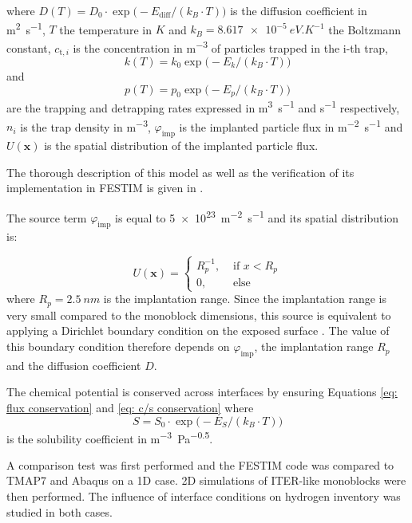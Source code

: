 where ${D(T)=D_0 \cdot \exp\big(-E_\mathrm{diff}/ (k_B \cdot T )\big)}$ is the diffusion coefficient in \si{m^2.s^{-1}}, $T$ the temperature in $\si{K}$ and ${k_B = \SI{8.617e-5}{eV.K^{-1}}}$ the Boltzmann constant, $c_{\mathrm{t}, i}$ is the concentration in \si{m^{-3}} of particles trapped in the i-th trap,
\begin{equation}
    k(T)=k_0\exp{\big(-E_{k} / (k_B \cdot T ) \big)}
\end{equation} and 
\begin{equation}
    p(T)=p_0\exp{\big(-E_{p}/ (k_B \cdot T )\big)}
\end{equation} 
are the trapping and detrapping rates expressed in \si{m^3.s^{-1}} and \si{s^{-1}} respectively, $n_i$ is the trap density in \si{m^{-3}}, $\varphi_\mathrm{imp}$ is the implanted particle flux in \si{m^{-2}.s^{-1}} and $U(\textbf{x})$ is the spatial distribution of the implanted particle flux.

The thorough description of this model as well as the verification of its implementation in FESTIM is given in .

The source term $\varphi_\mathrm{imp}$ is equal to \SI{5e23}{m^{-2}.s^{-1}} and its spatial distribution is:

\begin{equation}
    U(\textbf{x}) = \begin{cases}
    R_p^{-1},& \text{ if } x < R_p\\
    0,& \text{ else }
    \end{cases}
\end{equation}
where $R_p = \SI{2.5}{nm}$ is the implantation range.
Since the implantation range is very small compared to the monoblock dimensions, this source is equivalent to applying a Dirichlet boundary condition on the exposed surface .
The value of this boundary condition therefore depends on $\varphi_\mathrm{imp}$, the implantation range $R_p$ and the diffusion coefficient $D$.


The chemical potential is conserved across interfaces by ensuring Equations \ref{eq: flux conservation} and \ref{eq: c/s conservation} where 
\begin{equation}
    {S = S_0 \cdot \exp\big(-E_S/ (k_B \cdot T )\big)}
\end{equation} is the solubility coefficient in \si{m^{-3}.Pa^{-0.5}}.

A comparison test was first performed and the FESTIM code was compared to TMAP7  and Abaqus on a 1D case.
2D simulations of ITER-like monoblocks were then performed.
The influence of interface conditions on hydrogen inventory was studied in both cases.

